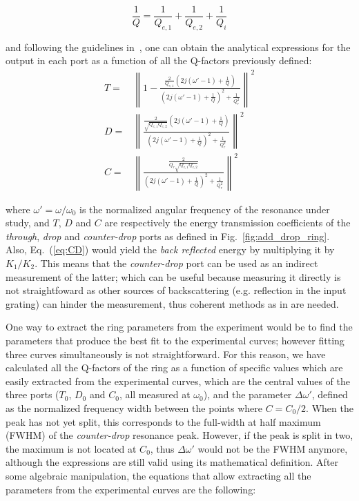 \documentclass[10pt,letterpaper]{article}
\begin{document}
\begin{equation}
	    \frac{1}{Q}=\frac{1}{Q_{e,1}}+\frac{1}{Q_{e,2}}+\frac{1}{Q_i}
\label{eq:Q_def}
\end{equation}

and following the guidelines in~\cite{Haus1984,Little1997,Zhang2008}, one can obtain the analytical expressions for the output in each port as a function of all the Q-factors previously defined:
\begin{subequations}
\label{eq:ports}
\begin{align}
	T=& \left\lVert1-\frac{        \frac{2}{Q_{e,1}}(2j(\omega '-1)+\frac{1}{Q})   }  {   (2j(\omega '-1)+\frac{1}{Q})^2+\frac{1}{Q_r^2}  }\right\rVert^2 \label{eq:T} \\
	D =& \left\lVert\frac{          \frac{2}{\sqrt{Q_{e,1}Q_{e,2}}}(2j(\omega '-1)+\frac{1}{Q})   }  {   (2j(\omega'-1)+\frac{1}{Q})^2+\frac{1}{Q_r^2}    }\right\rVert^2 \label{eq:D} \\
	C=& \left\lVert\frac{          \frac{2}{Q_r\sqrt{Q_{e,1}Q_{e,2}}}   }  {   (2j(\omega'-1)+\frac{1}{Q})^2+\frac{1}{Q_r^2}    }\right\rVert^2 \label{eq:CD}
\end{align}
\end{subequations}

where $\omega'=\omega/\omega_0$ is the normalized angular frequency of the resonance under study, and $T$, $D$ and $C$ are respectively the energy transmission coefficients of the \emph{through}, \emph{drop} and \emph{counter-drop} ports as defined in Fig.~\ref{fig:add_drop_ring}. Also, Eq.~(\ref{eq:CD}) would yield the \emph{back reflected} energy by multiplying it by $K_1/K_2$. This means that the \emph{counter-drop} port can be used as an indirect measurement of the latter; which can be useful because measuring it directly is not straightfoward as other sources of backscattering (e.g. reflection in the input grating) can hinder the measurement, thus coherent methods as in \cite{Morichetti2010a} are needed.


One way to extract the ring parameters from the experiment would be to find the parameters that produce the best fit to the experimental curves; however fitting three curves simultaneously is not straightforward. For this reason, we have calculated all the Q-factors of the ring as a function of specific values which are easily extracted from the experimental curves, which are the central values of the three ports ($T_0$, $D_0$ and $C_0$, all measured at $\omega_0$), and the parameter $\Delta\omega'$, defined as the normalized frequency width between the points where $C = C_0/2$. When the peak has not yet split, this corresponds to the full-width at half maximum (FWHM) of the \emph{counter-drop} resonance peak. However, if the peak is split in two, the maximum is not located at $C_0$, thus $\Delta\omega'$ would not be the FWHM anymore, although the expressions are still valid using its mathematical definition. After some algebraic manipulation, the equations that allow extracting all the parameters from the experimental curves are the following:
\end{document}
